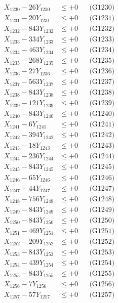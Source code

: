 \documentclass[a4paper,10pt]{article}
\begin{document}
{\begin{align}
X_{1230} - 26Y_{1230} &\leq +0 && \text{(G1230)} \\
\allowbreak
X_{1231} - 20Y_{1231} &\leq +0 && \text{(G1231)} \\
X_{1232} - 843Y_{1232} &\leq +0 && \text{(G1232)} \\
X_{1233} - 334Y_{1233} &\leq +0 && \text{(G1233)} \\
X_{1234} - 463Y_{1234} &\leq +0 && \text{(G1234)} \\
X_{1235} - 268Y_{1235} &\leq +0 && \text{(G1235)} \\
X_{1236} - 27Y_{1236} &\leq +0 && \text{(G1236)} \\
X_{1237} - 563Y_{1237} &\leq +0 && \text{(G1237)} \\
X_{1238} - 843Y_{1238} &\leq +0 && \text{(G1238)} \\
X_{1239} - 121Y_{1239} &\leq +0 && \text{(G1239)} \\
X_{1240} - 843Y_{1240} &\leq +0 && \text{(G1240)} \\
\allowbreak
X_{1241} - 6Y_{1241} &\leq +0 && \text{(G1241)} \\
X_{1242} - 394Y_{1242} &\leq +0 && \text{(G1242)} \\
X_{1243} - 18Y_{1243} &\leq +0 && \text{(G1243)} \\
X_{1244} - 236Y_{1244} &\leq +0 && \text{(G1244)} \\
X_{1245} - 843Y_{1245} &\leq +0 && \text{(G1245)} \\
X_{1246} - 65Y_{1246} &\leq +0 && \text{(G1246)} \\
X_{1247} - 44Y_{1247} &\leq +0 && \text{(G1247)} \\
X_{1248} - 756Y_{1248} &\leq +0 && \text{(G1248)} \\
X_{1249} - 843Y_{1249} &\leq +0 && \text{(G1249)} \\
X_{1250} - 843Y_{1250} &\leq +0 && \text{(G1250)} \\
\allowbreak
X_{1251} - 469Y_{1251} &\leq +0 && \text{(G1251)} \\
X_{1252} - 209Y_{1252} &\leq +0 && \text{(G1252)} \\
X_{1253} - 843Y_{1253} &\leq +0 && \text{(G1253)} \\
X_{1254} - 439Y_{1254} &\leq +0 && \text{(G1254)} \\
X_{1255} - 843Y_{1255} &\leq +0 && \text{(G1255)} \\
X_{1256} - 7Y_{1256} &\leq +0 && \text{(G1256)} \\
X_{1257} - 57Y_{1257} &\leq +0 && \text{(G1257)} \\

\end{align}}
\end{document}
